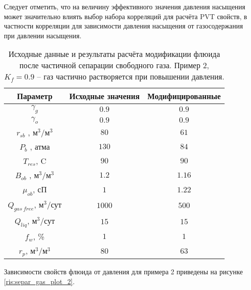 Следует отметить, что на величину эффективного значения давления насыщения может значительно влиять выбор набора корреляций для расчёта PVT свойств, в частности корреляции для зависимости давления насыщения от газосодержания при давлении насыщения. 

\begin{table}[h!]
	\caption{Исходные данные и результаты расчёта модификации флюида после частичной сепарации свободного газа. Пример 2, $K_f=0.9$ -- газ частично растворяется при повышении давления.}
	\begin{center}
		\begin{tabular}{ |c|c|c|} 
			\hline
			Параметр & Исходные значения & Модифицированные \\ 
			\hline
			$\gamma_g$ 				&$0.9$	& $0.9$    \\ 
			$\gamma_o$ 					&$0.9$	& $0.9$   \\ 
			$r_{sb}$ ,  м$^3$/м$^3$ 		&$80$	& $61$ \\ 
			$P_b$ , атма 					&$130$	& $84$ 	 \\ 
			$T_{res} $,  C 					&$90$	& $90$ \\ 
			$B_{ob} $ , м$^3$/м$^3$  		&$1.2$	& $1.16$ \\ 
			$\mu_{ob}  $,  сП  				&$1$	& $1.22$   \\ 
			\hline
			$Q_{gas\ free}  $,  м$^3$/сут  	&$1000$	& $500$  \\ 
			$Q_{liq}  $,  м$^3$/сут  			&$15$	& $15$ \\ 
			$f_{w}  $,  \%  					&$1$	& $1$  \\ 
			$r_p  $,  м$^3$/м$^3$  			&$80$	& $63$ \\ 
			\hline
		\end{tabular}
	\end{center}
\label{table:separ_gas_table_2}
\end{table}

Зависимости свойств флюида от давления для примера 2 приведены на рисунке \ref{ris:separ_gas_plot_2}.

